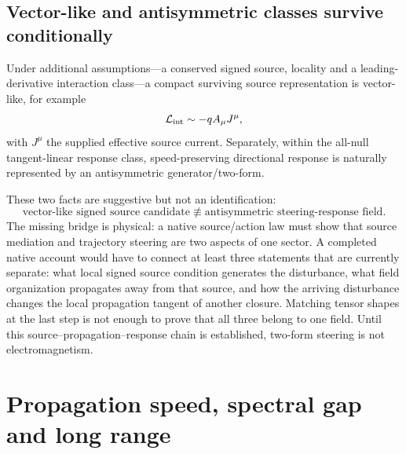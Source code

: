 \documentclass[11pt]{article}
\theoremstyle{definition}
\newcommand{\Lag}{\mathcal{L}}
\begin{document}
\subsection{Vector-like and antisymmetric classes survive conditionally}

Under additional assumptions---a conserved signed source, locality and a leading-derivative interaction class---a compact surviving source representation is vector-like, for example
\begin{equation}
 \Lag_{\rm int}\sim-qA_\mu J^\mu,
 \label{eq:conditional_vector_coupling}
\end{equation}
with $J^\mu$ the supplied effective source current.  Separately, within the all-null tangent-linear response class, speed-preserving directional response is naturally represented by an antisymmetric generator/two-form.

These two facts are suggestive but not an identification:
\begin{equation}
 \boxed{
 \text{vector-like signed source candidate}
 \not\equiv
 \text{antisymmetric steering-response field}.}
 \label{eq:source_response_not_identified}
\end{equation}
The missing bridge is physical: a native source/action law must show that source mediation and trajectory steering are two aspects of one sector.  A completed native account would have to connect at least three statements that are currently separate: what local signed source condition generates the disturbance, what field organization propagates away from that source, and how the arriving disturbance changes the local propagation tangent of another closure.  Matching tensor shapes at the last step is not enough to prove that all three belong to one field.  Until this source--propagation--response chain is established, two-form steering is not electromagnetism.

\section{Propagation speed, spectral gap and long range}
\label{sec:range_gap}
\end{document}

